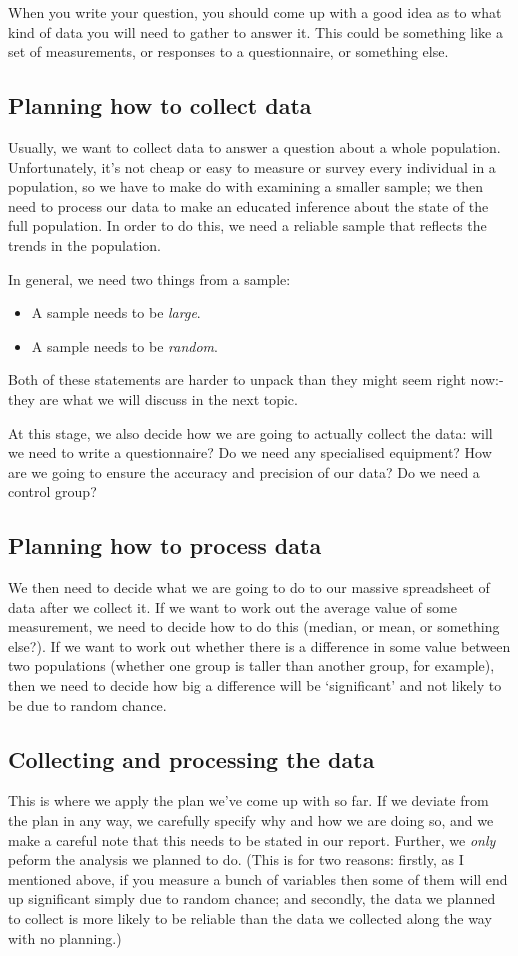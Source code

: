 When you write your question, you should come up with a good idea as to what kind of data you will need to gather to answer it. This could
be something like a set of measurements, or responses to a questionnaire, or something else.

\subsection*{Planning how to collect data}
Usually, we want to collect data to answer a question about a whole population. Unfortunately, it's not cheap or easy to measure or survey
every individual in a population, so we have to make do with examining a smaller sample; we then need to process our data to make an educated
inference about the state of the full population. In order to do this, we need a reliable sample that reflects the trends in the population.

In general, we need two things from a sample:
\begin{itemize}
  \item A sample needs to be \emph{large}.
  \item A sample needs to be \emph{random}.
\end{itemize}

Both of these statements are harder to unpack than they might seem right now:- they are what we will
discuss in the next topic.

At this stage, we also decide how we are going to actually collect the data: will we need to write a questionnaire? Do we need
any specialised equipment? How are we going to ensure the accuracy and precision of our data? Do we need a control group?

\subsection*{Planning how to process data}
We then need to decide what we are going to do to our massive spreadsheet of data after we collect it. If we want to work
out the average value of some measurement, we need to decide how to do this (median, or mean, or something else?). If we
want to work out whether there is a difference in some value between two populations (whether one group is taller than
another group, for example), then we need to decide how big a difference will be `significant' and not likely to be due
to random chance.

\subsection*{Collecting and processing the data}
This is where we apply the plan we've come up with so far. If we deviate from the plan in any way, we carefully specify
why and how we are doing so, and we make a careful note that this needs to be stated in our report. Further, we \emph{only}
peform the analysis we planned to do. (This is for two reasons: firstly, as I mentioned above, if you measure a bunch of
variables then some of them will end up significant simply due to random chance; and secondly, the data we planned to
collect is more likely to be reliable than the data we collected along the way with no planning.)

